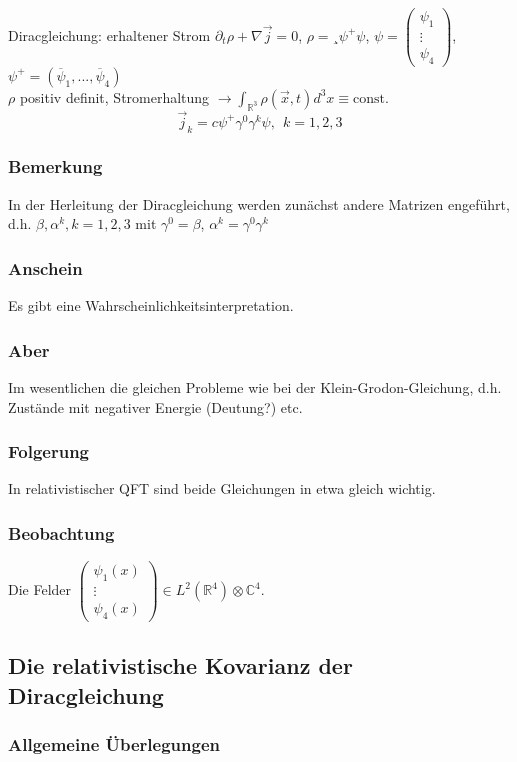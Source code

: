 \documentclass[twoside,a4paper]{scrartcl}
\newcommand{\R}{\mathbb{R}}
\newcommand{\C}{\mathbb{C}}
\renewcommand{\1}{\mathds{1}}
\newcommand{\ra}{\rightarrow}
\renewcommand{\R}{\mathbb{R}}
\renewcommand{\C}{\mathbb{C}}
\begin{document}
Diracgleichung: erhaltener Strom $\partial_t\rho+\nabla \vec j=0$, $\rho=¸\psi^+\psi$, $\psi=\begin{pmatrix}\psi_1 \\ \vdots \\ \psi_4\end{pmatrix}$, $\psi^+=(\overline{\psi}_1,...,\overline{\psi}_4)$\\
$\rho$ positiv definit, Stromerhaltung $\ra \int_{\R^3} \rho(\vec x,t) d^3x\equiv \mathrm{const.}$
$$\vec j_k=c\psi^+ \gamma^0\gamma^k\psi, \ \ k=1,2,3$$
\subsubsection*{Bemerkung}
In der Herleitung der Diracgleichung werden zunächst andere Matrizen engeführt, d.h. $\beta,\alpha^k,k=1,2,3$ mit $\gamma^0=\beta$, $\alpha^k=\gamma^0\gamma^k$
\subsubsection*{Anschein}
Es gibt eine Wahrscheinlichkeitsinterpretation.
\subsubsection*{Aber}
Im wesentlichen die gleichen Probleme wie bei der Klein-Grodon-Gleichung, d.h. Zustände mit negativer Energie (Deutung?) etc.
\subsubsection*{Folgerung}
In relativistischer QFT sind beide Gleichungen in etwa gleich wichtig.
\subsubsection*{Beobachtung}
Die Felder $\begin{pmatrix}\psi_1(x) \\ \vdots \\ \psi_4(x)\end{pmatrix}\in L^2(\R^4)\otimes \C^4$.

\subsection{Die relativistische Kovarianz der Diracgleichung}
\subsubsection{Allgemeine Überlegungen}
\end{document}
